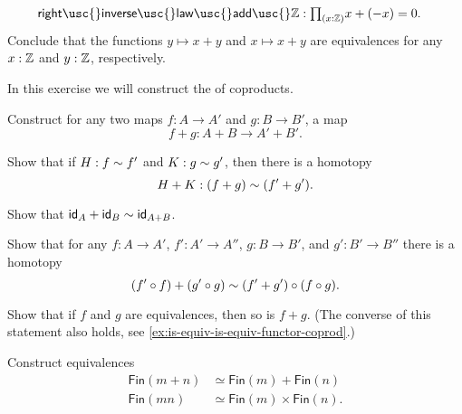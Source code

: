 \begin{exercises}
\begin{subexenum}
\begin{align*}
      \mathsf{right\usc{}inverse\usc{}law\usc{}add\usc{}}\Z & : \prd{x : \Z} x + (-x)=0.
    \end{align*}
    Conclude that the functions $y \mapsto x + y$ and $x\mapsto x + y$ are equivalences for any $x:\Z$ and $y:\Z$, respectively.
  \end{subexenum}
\item \label{ex:coproduct_functor}In this exercise we will construct the  of coproducts.
  \begin{subexenum}
  \item Construct for any two maps $f:A \to A'$ and $g:B \to B'$, a map
    \begin{equation*}
      f+g:A+B \to A'+B'.
    \end{equation*}
  \item Show that if $H:f\htpy f'$ and $K:g\htpy g'$, then there is a homotopy
    \begin{equation*}
      H+K:(f+g)\htpy (f'+g').
    \end{equation*}
  \item Show that $\idfunc[A]+\idfunc[B]\htpy \idfunc[A+B]$.
  \item Show that for any $f:A\to A'$, $f':A'\to A''$, $g:B\to B'$, and $g':B'\to B''$ there is a homotopy
    \begin{equation*}
      (f'\circ f)+(g'\circ g) \htpy (f'+g')\circ (f\circ g).
    \end{equation*}
  \item \label{ex:coproduct_functor_equivalence}Show that if $f$ and $g$ are equivalences, then so is $f+g$. (The converse of this statement also holds, see \cref{ex:is-equiv-is-equiv-functor-coprod}.)
  \end{subexenum}
\item Construct equivalences
  \begin{align*}
    \mathsf{Fin}(m+n) & \simeq \mathsf{Fin}(m)+\mathsf{Fin}(n) \\
    \mathsf{Fin}(mn) & \simeq \mathsf{Fin}(m)\times\mathsf{Fin}(n).
  \end{align*}
\end{exercises}

